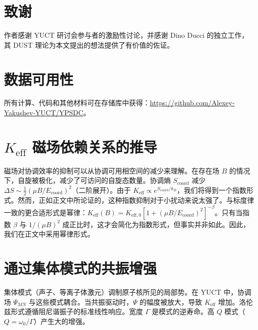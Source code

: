 \documentclass[12pt]{article}
\theoremstyle{remark}
\newcommand{\Keff}{K_{\mathrm{eff}}}
\newcommand{\Keffzero}{K_{\mathrm{eff},0}}
\begin{document}
	\section*{致谢}
	作者感谢 YUCT 研讨会参与者的激励性讨论，并感谢 Dino Ducci 的独立工作，其 DUST 理论为本文提出的想法提供了有价值的佐证。
	
	\section*{数据可用性}
	所有计算、代码和其他材料可在存储库中获得：\url{https://github.com/Alexey-Yakushev-YUCT/YPSDC}。
	
	\appendix
	\section{\(\Keff\) 磁场依赖关系的推导}
	\label{app:B}
	
	磁场对协调效率的抑制可以从协调可用相空间的减少来理解。在存在场 \(B\) 的情况下，自旋被极化，减少了可访问的自旋态数量。协调熵 \(S_{\text{coord}}\) 减少 \(\Delta S \sim \frac{1}{2} (\mu B / E_{\mathrm{coord}})^2\)（二阶展开）。由于 \(\Keff \propto e^{S_{\text{coord}}/k_B}\)，我们将得到一个指数形式。然而，正如正文中所论证的，这种指数抑制对于小扰动来说太强了。与标度律一致的更合适形式是幂律：\(\Keff(B) = \Keffzero [1 + (\mu B/E_{\mathrm{coord}})^2]^{-\beta}\)。只有当指数 \(\beta\) 与 \(1/(\mu B)^2\) 成正比时，这才会简化为指数形式，但事实并非如此。因此，我们在正文中采用幂律形式。
	
	\section{通过集体模式的共振增强}
	\label{app:resonance}
	
	集体模式（声子、等离子体激元）调制原子核所见的局部势。在 YUCT 中，协调场 \(\Psi_{MN}\) 与这些模式耦合。当共振驱动时，\(\Psi\) 的幅度被放大，导致 \(\Keff\) 增加。洛伦兹形式遵循阻尼谐振子的标准线性响应。宽度 \(\Gamma\) 是模式的逆寿命。高 \(Q\) 模式（\(Q = \omega_0/\Gamma\)）产生大的增强。
	
\end{document}
